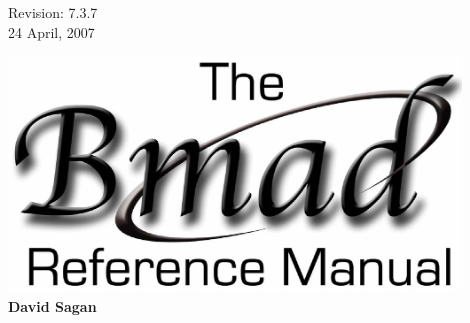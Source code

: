 \thispagestyle{empty}

\begin{flushright}
\large
  Revision: 7.3.7 \\
  24 April, 2007 \\
\end{flushright}

\vfill

{
\begin{center}
\includegraphics[width=12cm]{bmad-ref-manual.eps} \\
\vskip 0.3in
\huge\bf David Sagan
\end{center}
}

\vfill
\break

